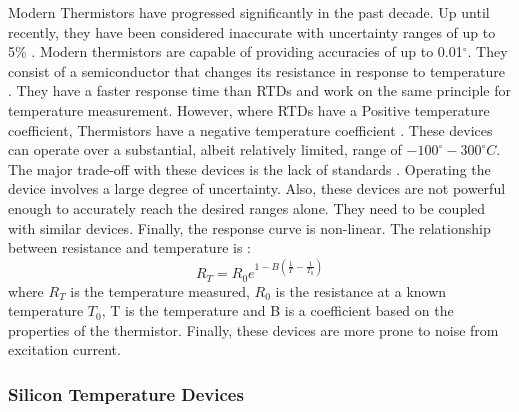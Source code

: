  Modern Thermistors have progressed significantly in the past decade. Up until recently, they have been considered inaccurate with uncertainty ranges of up to 5\% \cite{tong2001improving}. Modern thermistors are capable of providing accuracies of up to 0.01$^\circ$. They consist of a semiconductor that changes its resistance in response to temperature \cite{childs2000review}. They have a faster response time than RTDs and work on the same principle for temperature measurement. However, where RTDs have a Positive temperature coefficient, Thermistors have a negative temperature coefficient \cite{tong2001improving}. These devices can operate over a substantial, albeit relatively limited, range of $-100^\circ - 300^\circ C$. The major trade-off with these devices is the lack of standards \cite{tong2001improving}. Operating the device involves a large degree of uncertainty. Also, these devices are not powerful enough to accurately reach the desired ranges alone. They need to be coupled with similar devices. Finally, the response curve is non-linear. The  relationship between resistance and temperature is \cite{childs2000review}:
 \begin{equation}
     R_T = R_0e^{1 - B(\frac{1}{T}- \frac{1}{T_0})}
 \end{equation}
where $R_T$ is the temperature measured, $R_0$ is the resistance at a known temperature $T_0$, T is the temperature and B is a coefficient based on the properties of the thermistor. Finally, these devices are more prone to noise from excitation current.
 \subsubsection{Silicon Temperature Devices}
 
